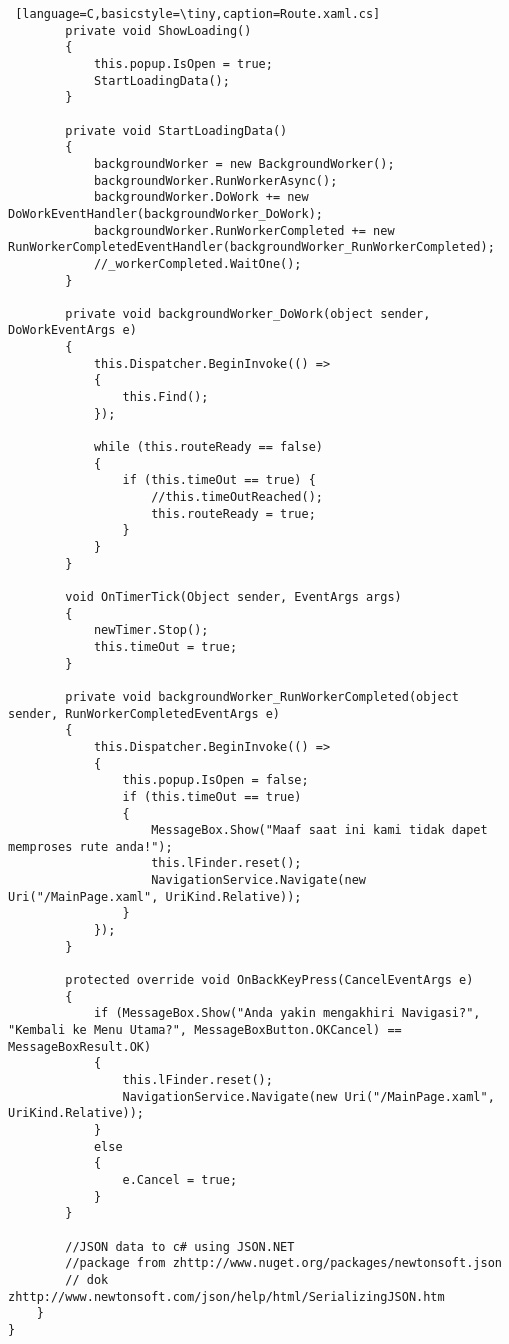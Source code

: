 \begin{lstlisting} [language=C,basicstyle=\tiny,caption=Route.xaml.cs]
        private void ShowLoading()
        {
            this.popup.IsOpen = true;
            StartLoadingData();
        }

        private void StartLoadingData()
        {
            backgroundWorker = new BackgroundWorker();
            backgroundWorker.RunWorkerAsync();
            backgroundWorker.DoWork += new DoWorkEventHandler(backgroundWorker_DoWork);
            backgroundWorker.RunWorkerCompleted += new RunWorkerCompletedEventHandler(backgroundWorker_RunWorkerCompleted);
            //_workerCompleted.WaitOne();
        }

        private void backgroundWorker_DoWork(object sender, DoWorkEventArgs e)
        {
            this.Dispatcher.BeginInvoke(() =>
            {
                this.Find();
            });
            
            while (this.routeReady == false)
            {
                if (this.timeOut == true) {
                    //this.timeOutReached();
                    this.routeReady = true;
                }
            }
        }

        void OnTimerTick(Object sender, EventArgs args)
        {
            newTimer.Stop();
            this.timeOut = true;
        }

        private void backgroundWorker_RunWorkerCompleted(object sender, RunWorkerCompletedEventArgs e)
        {
            this.Dispatcher.BeginInvoke(() =>
            {
                this.popup.IsOpen = false;
                if (this.timeOut == true)
                {
                    MessageBox.Show("Maaf saat ini kami tidak dapet memproses rute anda!");
                    this.lFinder.reset();
                    NavigationService.Navigate(new Uri("/MainPage.xaml", UriKind.Relative));
                }
            });
        }

        protected override void OnBackKeyPress(CancelEventArgs e)
        {
            if (MessageBox.Show("Anda yakin mengakhiri Navigasi?", "Kembali ke Menu Utama?", MessageBoxButton.OKCancel) == MessageBoxResult.OK)
            {
                this.lFinder.reset();
                NavigationService.Navigate(new Uri("/MainPage.xaml", UriKind.Relative));
            }
            else
            {
                e.Cancel = true;
            }
        }

        //JSON data to c# using JSON.NET
        //package from zhttp://www.nuget.org/packages/newtonsoft.json
        // dok zhttp://www.newtonsoft.com/json/help/html/SerializingJSON.htm
    }
}
\end{lstlisting}


